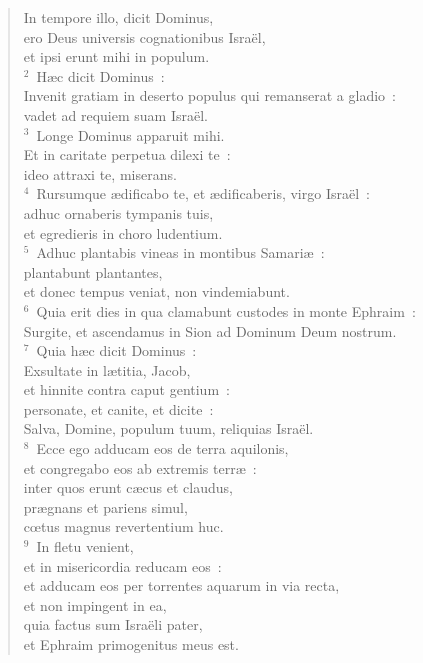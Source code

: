 \begin{flushleft}\begin{verse}\vspace{-19pt}\hspace{6pt}In tempore illo, dicit Dominus,\\\hspace{6pt} ero Deus universis cognationibus Isra\"el,\\ et ipsi erunt mihi in populum.\\
${}^{2}$~H\ae c dicit Dominus~:\\ Invenit gratiam in deserto populus qui remanserat a gladio~:\\ vadet ad requiem suam Isra\"el.\\
${}^{3}$~Longe Dominus apparuit mihi.\\ Et in caritate perpetua dilexi te~:\\ ideo attraxi te, miserans.\\
${}^{4}$~Rursumque \ae dificabo te, et \ae dificaberis, virgo Isra\"el~:\\ adhuc ornaberis tympanis tuis,\\ et egredieris in choro ludentium.\\
${}^{5}$~Adhuc plantabis vineas in montibus Samari\ae~:\\ plantabunt plantantes,\\ et donec tempus veniat, non vindemiabunt.\\
${}^{6}$~Quia erit dies in qua clamabunt custodes in monte Ephraim~:\\ Surgite, et ascendamus in Sion ad Dominum Deum nostrum.\\
${}^{7}$~Quia h\ae c dicit Dominus~:\\ Exsultate in l\ae titia, Jacob,\\ et hinnite contra caput gentium~:\\ personate, et canite, et dicite~:\\ Salva, Domine, populum tuum, reliquias Isra\"el.\\
${}^{8}$~Ecce ego adducam eos de terra aquilonis,\\ et congregabo eos ab extremis terr\ae~:\\ inter quos erunt c\ae cus et claudus,\\ pr\ae gnans et pariens simul,\\ cœtus magnus revertentium huc.\\
${}^{9}$~In fletu venient,\\ et in misericordia reducam eos~:\\ et adducam eos per torrentes aquarum in via recta,\\ et non impingent in ea,\\ quia factus sum Isra\"eli pater,\\ et Ephraim primogenitus meus est.\\

\end{verse}
\end{flushleft}
